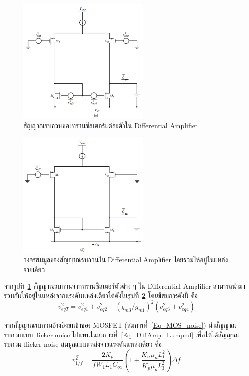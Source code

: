 \documentclass[a4paper, 11pt, oneside]{book} %
\begin{document}
\begin{figure}[h]
    \centering
    \includegraphics[width = 6.5cm]{DiffAmp_noise_1}
    \caption{สัญญาณรบกวนของทรานซิสเตอร์แต่ละตัวใน Differential Amplifier \cite{Grey09}}
    \label{DiffAmp_noise_1}
\end{figure}

\begin{figure}[h]
    \centering
    \includegraphics[width = 6.5cm]{DiffAmp_noise_2}
    \caption{วงจรสมมูลของสัญญาณรบกวนใน Differential Amplifier โดยรวมให้อยู่ในแหล่งจ่ายเดียว \cite{Grey09}}
    \label{DiffAmp_noise_2}
\end{figure}

จากรูปที่~\ref{DiffAmp_noise_1} สัญญาณรบกวนจากทรานซิสเตอร์ตัวต่าง ๆ ใน Differential Amplifier สามารถนำมารวมกันให้อยู่ในแหล่งจากแรงดันแหล่งเดียวได้ดังในรูปที่~\ref{DiffAmp_noise_2} โดยมีสมการดังนี้ คือ \cite{Grey09}
\begin{equation}
    \bar{v_{eqT}^2} = \bar{v_{eq1}^2} + \bar{v_{eq2}^2} + (g_{m3}/g_{m1})^2 (\bar{v_{eq3}^2} + \bar{v_{eq4}^2}) \label{Eq_DiffAmp_Lumped}
\end{equation}

จากสัญญาณรบกวนอ้างอิงขาเข้าของ MOSFET (สมการที่~\ref{Eq_MOS_noise})  นำสัญญาณรบกวนแบบ flicker noise ไปแทนในสมการที่~\ref{Eq_DiffAmp_Lumped} เพื่อให้ได้สัญญาณรบกวน flicker noise สมมูลแบบแหล่งจ่ายแรงดันแหล่งเดียว คือ
\begin{equation}
    \bar{v_{1/f}^2} = \frac{2K_p}{fW_1L_1C_{ox}}(1 + \frac{K_n\mu_nL_1^2}{K_p\mu_pL_3^2})\Delta f
    \label{Eq_DiffAmp_flicker}
\end{equation}
\end{document}
